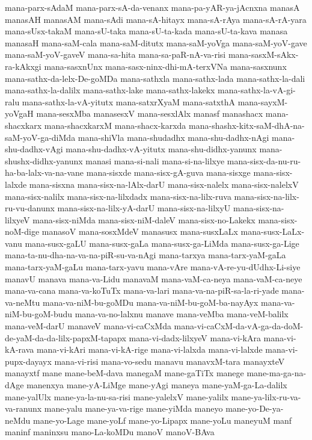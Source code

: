 {mana-parx-sAdaM
mana-parx-sA-da-venanx
mana-pa-yAR-ya-jAcnxna
manasA
manasAH
manasAM
mana-sAdi
mana-sA-hitayx
mana-sA-rAya
mana-sA-rA-yara
mana-sUsx-takaM
mana-sU-taka
mana-sU-ta-kada
mana-sU-ta-kava
manasa
manasaH
mana-saM-cala
mana-saM-ditutx
mana-saM-yoVga
mana-saM-yoV-gave
mana-saM-yoV-gaveV
mana-sa-hita
mana-sa-paR-nA-va-risi
mana-sasxM-sAkx-ra-kAkxgi
mana-sasxnUnx
mana-sasx-ninx-dhi-mA-terxVNa
mana-sasxnunx
mana-sathx-da-lelx-De-goMDa
mana-sathxla
mana-sathx-lada
mana-sathx-la-dali
mana-sathx-la-dalilx
mana-sathx-lake
mana-sathx-lakekx
mana-sathx-la-vA-gi-ralu
mana-sathx-la-vA-yitutx
mana-satxrXyaM
mana-satxthA
mana-sayxM-yoVgaH
mana-sesxMba
manasesxV
mana-sesxlAlx
manasf
manashacx
mana-shacxkarx
mana-shacxkarxM
mana-shacx-karxda
mana-shashx-kitx-saM-dhA-na-saM-yoV-ga-diMda
mana-shiVla
mana-shudadhx
mana-shu-dadhx-nAgi
mana-shu-dadhx-vAgi
mana-shu-dadhx-vA-yitutx
mana-shu-didhx-yanunx
mana-shushx-didhx-yanunx
manasi
mana-si-nali
mana-si-na-lilxye
mana-sisx-da-nu-ru-ha-ba-lalx-va-na-vane
mana-sisxde
mana-sisx-gA-guva
mana-sisxge
mana-sisx-lalxde
mana-sisxna
mana-sisx-na-lAlx-darU
mana-sisx-nalelx
mana-sisx-nalelxV
mana-sisx-nalilx
mana-sisx-na-lilxdadx
mana-sisx-na-lilx-ruva
mana-sisx-na-lilx-ru-vu-danunx
mana-sisx-na-lilx-yA-darU
mana-sisx-na-lilxyU
mana-sisx-na-lilxyeV
mana-sisx-niMda
mana-sisx-niM-daleV
mana-sisx-no-Lakekx
mana-sisx-noM-dige
manasoV
mana-sosxMdeV
manasusx
mana-susxLaLx
mana-susx-LaLx-vanu
mana-susx-gaLU
mana-susx-gaLa
mana-susx-ga-LiMda
mana-susx-ga-Lige
mana-ta-nu-dha-na-va-na-piR-su-va-nAgi
mana-tarxya
mana-tarx-yaM-gaLa
mana-tarx-yaM-gaLu
mana-tarx-yavu
mana-vAre
mana-vA-re-yu-dUdhx-Li-siye
manavU
manava
mana-va-Lidu
manavaM
mana-vaM-ca-neya
mana-vaM-ca-neye
mana-va-cana
mana-va-koTuTx
mana-va-lari
mana-va-na-piR-sa-la-ri-yade
mana-va-neMtu
mana-va-niM-bu-goMDu
mana-va-niM-bu-goM-ba-nayAyx
mana-va-niM-bu-goM-budu
mana-va-no-lalxnu
manave
mana-veMba
mana-veM-balilx
mana-veM-darU
manaveV
mana-vi-caCxMda
mana-vi-caCxM-da-vA-ga-da-doM-de-yaM-da-da-lilx-papxM-tapapx
mana-vi-dadx-lilxyeV
mana-vi-kAra
mana-vi-kA-rava
mana-vi-kAri
mana-vi-kA-rige
mana-vi-lalxda
mana-vi-lalxde
mana-vi-pupx-dayayx
mana-vi-risi
mana-vo-sedu
manavu
manavxM-tara
manayxteV
manayxtf
mane
mane-beM-dava
manegaM
mane-gaTiTx
manege
mane-ma-ga-na-dAge
manenxya
mane-yA-LiMge
mane-yAgi
maneya
mane-yaM-ga-La-dalilx
mane-yalUlx
mane-ya-la-nu-sa-risi
mane-yalelxV
mane-yalilx
mane-ya-lilx-ru-va-va-ranunx
mane-yalu
mane-ya-va-rige
mane-yiMda
maneyo
mane-yo-De-ya-neMdu
mane-yo-Lage
mane-yoLf
mane-yo-Lipapx
mane-yoLu
maneyuM
manf
maninf
maninxsu
mano-La-koMDu
manoV
manoV-BAva
}

